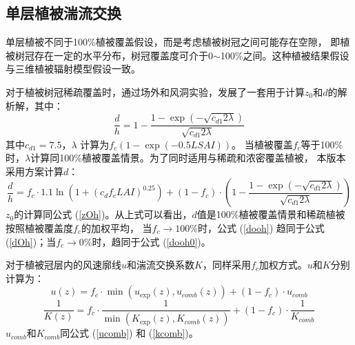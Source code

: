 \subsection{单层植被湍流交换}
单层植被不同于100\%植被覆盖假设，而是考虑植被树冠之间可能存在空隙，
即植被树冠存在一定的水平分布，树冠覆盖度可介于0$\sim$100\%之间。这种植被结果假设与三维植被辐射模型假设一致。


对于植被树冠稀疏覆盖时，\citet{raupach1992drag,raupach1994simplified}通过场外和风洞实验，发展了一套用于计算$z_0$和$d$的解析解，其中：
\begin{equation}\label{dooh0}
\frac{d}{h}=1-\frac{1-\exp \left(-\sqrt{c_{d1} 2 \lambda}\right)}{\sqrt{c_{d1} 2 \lambda}}
\end{equation}
其中$c_{d1}=7.5$，$\lambda$%
计算为$f_c\left(1-\exp{\left(-0.5LSAI\right)}\right)$。
当植被覆盖$f_c$等于100\%时，$\lambda$计算同100\%植被覆盖情景。为了同时适用与稀疏和浓密覆盖植被，
本版本采用\citet{dai2019different}方案计算$d$：
\begin{equation}\label{dooh}
\frac{d}{h}=f_{c} \cdot 1.1 \ln \left(1+\left(c_{d} f_{c} LAI\right)^{0.25}\right)+\left(1-f_{c}\right) \cdot\left(1-\frac{1-\exp \left(-\sqrt{c_{d1} 2 \lambda}\right)}{\sqrt{c_{d1} 2 \lambda}}\right)
\end{equation}
$z_0$的计算同公式 (\ref{zOh})。从上式可以看出，$d$值是100\%植被覆盖情景和稀疏植被按照植被覆盖度$f_c$的加权平均，
当$f_c\rightarrow100\%$时，公式 (\ref{dooh}) 趋同于公式 (\ref{dOh})；当$f_c\rightarrow0\%$时，趋同于公式 (\ref{dooh0})。


对于植被冠层内的风速廓线$u$和湍流交换系数$K$，同样采用$f_c$加权方式。$u$和$K$分别计算为：
\begin{equation}
u(z)=f_{c} \cdot \min \left(u_{\exp }(z), u_{comb}(z)\right)+\left(1-f_{c}\right) \cdot u_{comb}
\end{equation}
\begin{equation}
\frac{1}{K(z)}=f_{c} \cdot \frac{1}{\min \left(K_{\exp}(z), K_{comb}(z)\right)}+\left(1-f_{c}\right) \cdot \frac{1}{K_{comb}}
\end{equation}
$u_{comb}$和$K_{comb}$同公式 (\ref{ucomb}) 和 (\ref{kcomb})。


